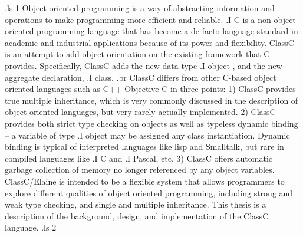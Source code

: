 .ls 1
Object oriented programming is a way of abstracting information and
operations to make programming more efficient and reliable.
.I C
is a non object oriented programming language that has become a de facto
language standard in academic and industrial applications because of its
power and flexibility.  ClassC is an attempt to add object orientation
on the existing framework that C provides.
Specifically, ClassC adds the new data type
.I object
, and the new aggregate declaration,
.I class.
.br
        ClassC differs from other C-based object oriented languages such as C++
Objective-C in three points:
  1) ClassC provides true multiple inheritance, which is very commonly
discussed in the description of object oriented languages, but very
rarely actually implemented.
  2) ClassC provides both strict type checking on objects
as well as typeless dynamic binding -- a variable of type
.I object
may be assigned any class instantiation.  Dynamic binding is
typical of interpreted
languages like lisp and Smalltalk, but rare in compiled languages like
.I C
and
.I Pascal,
etc.
  3) ClassC offers automatic garbage collection of memory no longer
referenced by any object variables.
        ClassC/Elaine is intended to be a flexible system that
allows programmers to
explore different qualities of object oriented programming, including strong
and weak type checking, and single and multiple inheritance. This thesis is
a description of the background, design, and implementation
of the ClassC language.
.ls 2
